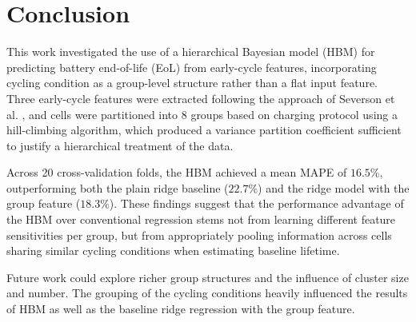 \section{Conclusion}

This work investigated the use of a hierarchical Bayesian model (HBM) for predicting battery end-of-life (EoL) from early-cycle features, incorporating cycling condition as a group-level structure rather than a flat input feature. Three early-cycle features were extracted following the approach of Severson et al. \cite{severson2019}, and cells were partitioned into 8 groups based on charging protocol using a hill-climbing algorithm, which produced a variance partition coefficient sufficient to justify a hierarchical treatment of the data.

Across 20 cross-validation folds, the HBM achieved a mean MAPE of $16.5\%$, outperforming both the plain ridge baseline ($22.7\%$) and the ridge model with the group feature ($18.3\%$). These findings suggest that the performance advantage of the HBM over conventional regression stems not from learning different feature sensitivities per group, but from appropriately pooling information across cells sharing similar cycling conditions when estimating baseline lifetime.

Future work could explore richer group structures and the influence of cluster size and number. The grouping of the cycling conditions heavily influenced the results of HBM as well as the baseline ridge regression with the group feature.
